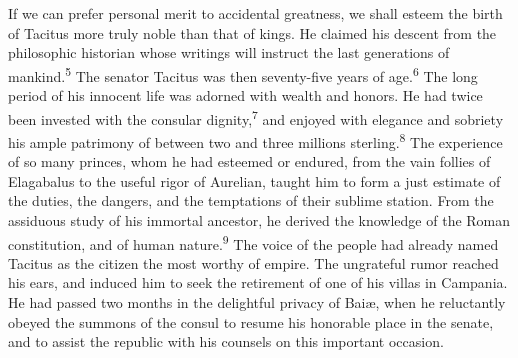 
If we can prefer personal merit to accidental greatness, we shall
esteem the birth of Tacitus more truly noble than that of kings.
He claimed his descent from the philosophic historian whose
writings will instruct the last generations of mankind.\textsuperscript{5} The
senator Tacitus was then seventy-five years of age.\textsuperscript{6} The long
period of his innocent life was adorned with wealth and honors.
He had twice been invested with the consular dignity,\textsuperscript{7} and
enjoyed with elegance and sobriety his ample patrimony of between
two and three millions sterling.\textsuperscript{8} The experience of so many
princes, whom he had esteemed or endured, from the vain follies
of Elagabalus to the useful rigor of Aurelian, taught him to form
a just estimate of the duties, the dangers, and the temptations
of their sublime station. From the assiduous study of his
immortal ancestor, he derived the knowledge of the Roman
constitution, and of human nature.\textsuperscript{9} The voice of the people had
already named Tacitus as the citizen the most worthy of empire.
The ungrateful rumor reached his ears, and induced him to seek
the retirement of one of his villas in Campania. He had passed
two months in the delightful privacy of Baiæ, when he reluctantly
obeyed the summons of the consul to resume his honorable place in
the senate, and to assist the republic with his counsels on this
important occasion.





